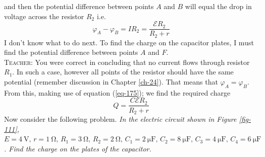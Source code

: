 \documentclass[a4paper,sfsidenotes]{tufte-book}
\newcommand{\Ea}{\mathcal{E}}
\begin{document}
and then the potential difference between points $A$ and $B$ will equal the drop in voltage across the resistor $R_{2}$ i.e. 
 \begin{equation}
 \varphi_{A} - \varphi_{B} = IR_{2} = \frac{\Ea R_{2}}{R_{2}+ r}
\label{eq-175}
\end{equation}
I don't know what to do next. To find the charge on the capacitor plates, I must find the potential difference between points $A$ and $F$.
\\
\textsc{Teacher:} You were correct in concluding that no current flows through resistor $R_{1}$. In such a case, however all points of the resistor should have the same potential (remember discussion in Chapter \ref{ch-24}). That means that $\varphi_{A} = \varphi_{B}$. From this, making use of equation (\ref{eq-175}); we find the required charge
\begin{equation}%
Q = \frac{C \Ea R_{2}}{R_{2}+ r}
\label{eq-176}
\end{equation}
Now consider the following problem. \emph{In the electric circuit shown in \emph{Figure \ref{fig-111}}, $E = \SI{4}{\volt}, \, r =\SI{1}{\ohm}, \, R_{1} =\SI{3}{\ohm},\, R_{2} = \SI{2}{\ohm},\, C_{1} = \SI{2}{\micro \farad}, \, C_{2} = \SI{8}{\micro \farad},\, C_{3} = \SI{4}{\micro \farad},\, C_{4} = \SI{6}{\micro \farad}$. Find the charge on the plates of the capacitor.}
\end{document}
